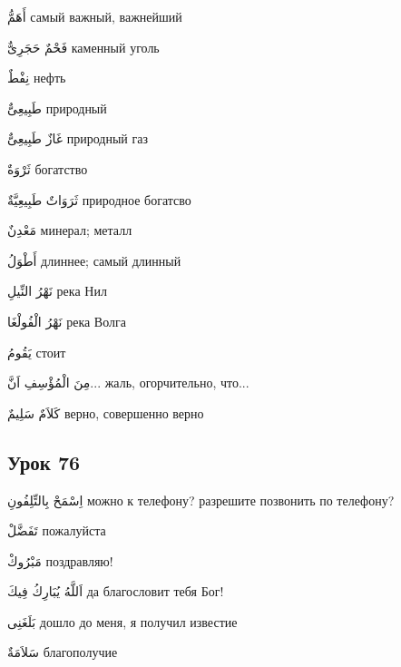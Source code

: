 \documentclass[a5paper]{article}
\newcommand\textstyleDropCaps[1]{#1}
\newcommand\textstyleCaptioncharacters[1]{#1}
\begin{document}
\textstyleCaptioncharacters{أَهَمُّ }\textstyleDropCaps{самый важный, важ­нейший‎}

\textstyleCaptioncharacters{فَحْمٌ حَجَرِىٌّ }\textstyleDropCaps{каменный уголь‎}

\textstyleCaptioncharacters{نِفْطٌ }\textstyleDropCaps{нефть‎}

\textstyleCaptioncharacters{طَبِيعِىٌّ }\textstyleDropCaps{природный‎}

\textstyleCaptioncharacters{غَازٌ طَبِيعِىٌّ }\textstyleDropCaps{природный газ‎}

\textstyleCaptioncharacters{ثَرْوَةٌ }\textstyleDropCaps{богатство‎}

\textstyleCaptioncharacters{ثَرَوَاتٌ طَبِيعِيَّةٌ }\textstyleDropCaps{природн­ое богатсво‎}

\textstyleCaptioncharacters{مَعْدِنٌ }\textstyleDropCaps{минерал; металл‎}

\textstyleCaptioncharacters{أَطْوَلُ }\textstyleDropCaps{длиннее; самый длинный‎}

\textstyleCaptioncharacters{نَهْرُ النِّيلِ }\textstyleDropCaps{река Нил‎}

\textstyleCaptioncharacters{نَهْرُ الْفُولْغَا }\textstyleDropCaps{река Волга‎}

\textstyleCaptioncharacters{يَقُومُ }\textstyleDropCaps{стоит‎}

\textstyleCaptioncharacters{مِنَ الْمُؤْسِفِ اَنَّ...ِ }\textstyleDropCaps{жаль, огорчительно, что...‎}

\textstyleCaptioncharacters{كَلاَمٌ سَلِيمٌ }\textstyleDropCaps{верно, со­вершенно верно‎}

\subsection[Урок 76‎]{\textstyleDropCaps{Урок 76‎}}
\textstyleCaptioncharacters{اِسْمَحْ بِالتِّلِفُونِ }\textstyleDropCaps{можно к телефону? разрешите позвонить по телефону?‎}

\textstyleCaptioncharacters{تَفَضَّلْ }\textstyleDropCaps{пожалуйста‎}

\textstyleCaptioncharacters{مَبْرُوكْ }\textstyleDropCaps{поздравляю!‎}

\textstyleCaptioncharacters{اَللَّهُ يُبَارِكُ فِيكَ }\textstyleDropCaps{да благословит тебя Бог!‎}

\textstyleCaptioncharacters{بَلَغَنِى }\textstyleDropCaps{дошло до меня, я получил известие‎}

\textstyleCaptioncharacters{سَلاَمَةٌ }\textstyleDropCaps{благополучие‎}
\end{document}
